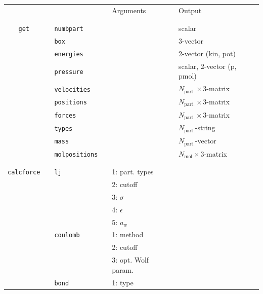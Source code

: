 \documentclass[11pt]{article}
\begin{document}
\clearpage
\begin{center}
  
  \begin{tabular}{cclclclll}
    {\color{red}{\textbf{Action}}} && {\color{blue}{Specifier}} && Arguments && Output \\
                                   && && && \\
    \hline
                                   && && && \\
    \verb!get! && \verb!numbpart!&& && scalar\\
               && \verb!box! && && 3-vector \\
               && \verb!energies! && && 2-vector (kin, pot)\\
               && \verb!pressure! && && scalar, 2-vector (p, pmol) \\
               && \verb!velocities! && && $N_\mathrm{part.}\times 3$-matrix \\
               && \verb!positions! && &&  $N_\mathrm{part.}\times 3$-matrix \\
               && \verb!forces! && &&  $N_\mathrm{part.}\times 3$-matrix \\
               && \verb!types! && && $N_\mathrm{part.}$-string \\
               && \verb!mass! && && $N_\mathrm{part.}$-vector \\
               && \verb!molpositions! && && $N_\mathrm{mol}\times 3$-matrix \\
                                       && && && \\
    \hline
                                   && && && \\
    \verb!calcforce! && \verb!lj! && 1: part. types && \\
                                   && && 2: cutoff&& \\
                                   && && 3: $\sigma$ && \\
                                   && && 4: $\epsilon$ && \\
                                   && && 5: $a_w$ && \\
                  &&\verb!coulomb!&& 1: method && \\
                                   && && 2: cutoff && \\
                                   && && 3: opt. Wolf param.\\
                    && \verb!bond! && 1: type && \\  

\end{tabular}
\end{center}
\end{document}

